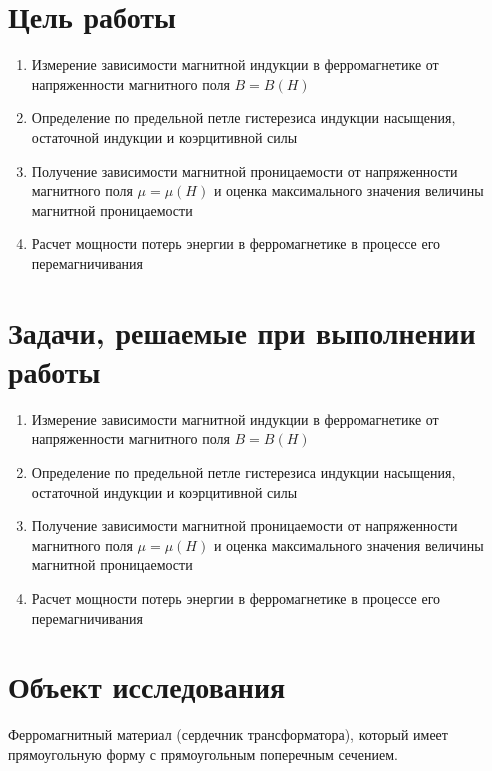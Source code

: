 \section{Цель работы}

\begin{enumerate}
    \item Измерение зависимости магнитной индукции в ферромагнетике от напряженности магнитного поля $B = B(H)$
    
    \item Определение по предельной петле гистерезиса индукции насыщения, остаточной индукции и коэрцитивной силы
    
    \item Получение зависимости магнитной проницаемости от напряженности магнитного поля $\mu = \mu(H)$ и оценка максимального значения величины магнитной проницаемости
    
    \item Расчет мощности потерь энергии в ферромагнетике в процессе его перемагничивания
\end{enumerate}

\section{Задачи, решаемые при выполнении работы}

\begin{enumerate}
    \item Измерение зависимости магнитной индукции в ферромагнетике от напряженности магнитного поля $B = B(H)$
    
    \item Определение по предельной петле гистерезиса индукции насыщения, остаточной индукции и коэрцитивной силы
    
    \item Получение зависимости магнитной проницаемости от напряженности магнитного поля $\mu = \mu(H)$ и оценка максимального значения величины магнитной проницаемости
    
    \item Расчет мощности потерь энергии в ферромагнетике в процессе его перемагничивания
\end{enumerate}

\section{Объект исследования}

Ферромагнитный материал (сердечник трансформатора), который имеет прямоугольную форму с прямоугольным поперечным сечением. 

